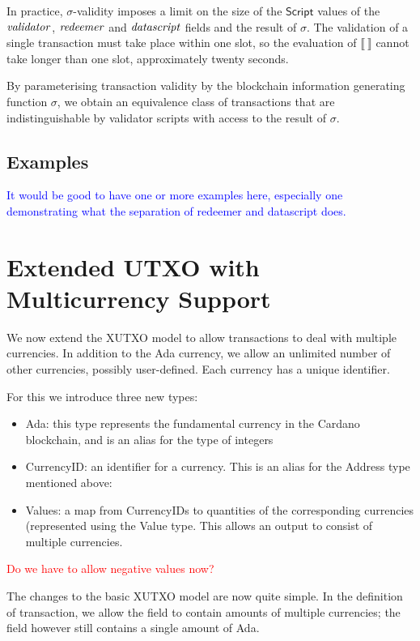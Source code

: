 \documentclass[a4paper]{article}
\newcommand{\red}[1]{\textcolor{red}{#1}}
\newcommand{\blue}[1]{\textcolor{blue}{#1}}
\newcommand{\s}{\textsf}  %
\theoremstyle{definition}  %
\begin{document}
In practice, $\sigma$-validity imposes a limit on the size of the
$\mathsf{Script}$ values of the $\mathit{validator}$, $\mathit{redeemer}$ and
$\mathit{datascript}$ fields and the result of $\sigma$. The validation of a
single transaction must take place within one slot, so the evaluation
of $\llbracket ~ \rrbracket$ cannot take longer than one slot,
approximately twenty seconds.

By parameterising transaction validity by the blockchain information
generating function $\sigma$, we obtain an equivalence class of
transactions that are indistinguishable by validator scripts with
access to the result of $\sigma$.

\subsection{Examples}
\blue{It would be good to have one or more examples here, especially one
  demonstrating what the separation of redeemer and datascript does.}

\section{Extended UTXO with Multicurrency Support}
\label{sec:multicurrency}
We now extend the XUTXO model to allow transactions to deal with
multiple currencies.  In addition to the Ada currency, we allow an
unlimited number of other currencies, possibly user-defined.  Each currency
has a unique identifier.

For this we introduce three new types:
\begin{itemize}
\item \s{Ada}: this type represents the fundamental currency in the Cardano
  blockchain, and is an alias for the type of integers
\item \s{CurrencyID}: an identifier for a currency. This is an alias
  for the \s{Address} type mentioned above:
\item \s{Values}: a map from \s{CurrencyID}s to quantities of the
  corresponding currencies (represented using the \s{Value} type.
  This allows an output to consist of multiple currencies.
\end{itemize}

\red{Do we have to allow negative values now?}

\noindent The changes to the basic XUTXO model are now quite simple.  In the
definition of transaction, we allow the \forge{} field to contain
amounts of multiple currencies; the \fee{} field however still
contains a single amount of \s{Ada}.  
\end{document}
